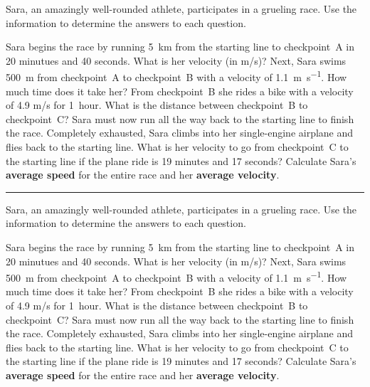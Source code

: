 \documentclass[12pt]{exam}
\newcommand{\prob}{

  \noindent
  Sara, an amazingly well-rounded athlete, participates in a grueling race. Use the information to determine the answers to each question.

 \begin{questions}
 
  \question 
      Sara begins the race by running 5~km from the starting line to checkpoint~A in 20 minutues and 40 seconds.  What is her velocity (in m/s)?
    \question
      Next, Sara swims \SI{500}{\meter} from checkpoint~A to checkpoint~B with a velocity of \SI{1.1}{\meter\per\second}.  How much time does it take her?
    \question
      From checkpoint~B she rides a bike with a velocity of 4.9 m/s for 1~hour.  What is the distance between checkpoint~B to checkpoint~C?
    \question
      Sara must now run all the way back to the starting line to finish the race.  Completely exhausted, Sara climbs into her single-engine airplane and flies back to the starting line.  What is her velocity to go from checkpoint~C to the starting line if the plane ride is 19 minutes and 17 seconds?
    \question
      Calculate Sara's {\bf average speed} for the entire race and her {\bf average velocity}.
 \end{questions}
}
\begin{document}
  \large

  \prob
  \hrule
  \vs
  \prob
\end{document}
